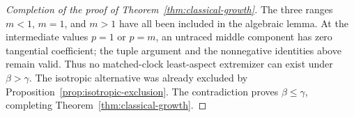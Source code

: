 \begin{proof}[Completion of the proof of Theorem~\ref{thm:classical-growth}]
The three ranges $m<1$, $m=1$, and $m>1$ have all been included in
the algebraic lemma.  At the intermediate values $p=1$ or $p=m$,
an untraced middle component has zero tangential coefficient; the
tuple argument and the nonnegative identities above remain valid.
Thus no matched-clock least-aspect extremizer can exist under
$\beta>\gamma$.  The isotropic alternative was already excluded by
Proposition~\ref{prop:isotropic-exclusion}.  The contradiction proves
$\beta\le\gamma$, completing Theorem~\ref{thm:classical-growth}.
\end{proof}
